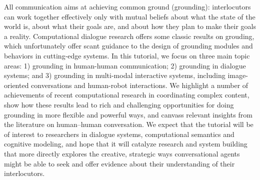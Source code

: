 All communication aims at achieving common ground (grounding): interlocutors can work together effectively only with mutual beliefs about  what the state of the world is, about what their goals are, and about how they plan to make their goals a reality.  Computational dialogue research offers some classic results on grouding, which unfortunately offer scant guidance to the design of grounding modules and behaviors in cutting-edge systems. In this tutorial, we focus on three main topic areas: 1) grounding in human-human communication; 2) grounding in dialogue systems; and 3) grounding in multi-modal interactive systems, including image-oriented conversations and human-robot interactions.  We highlight a number of achievements of recent computational research in coordinating complex content, show how these results lead to rich and challenging opportunities for doing grounding in more flexible and powerful ways, and canvass relevant insights from the literature on human--human conversation.  We expect that the tutorial will be of interest to researchers in dialogue systems, computational semantics and cognitive modeling, and hope that it will catalyze research and system building that more directly explores the creative, strategic ways conversational agents might be able to seek and offer evidence about their understanding of their interlocutors.
